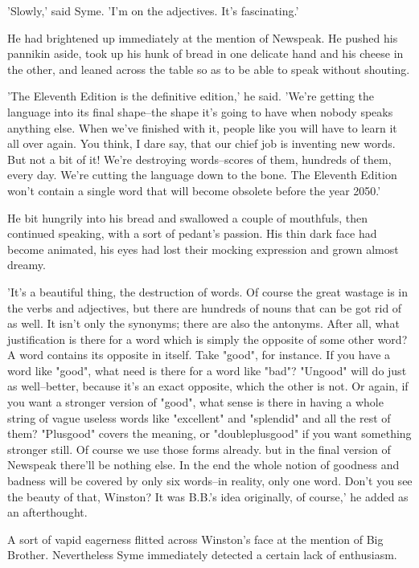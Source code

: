 \documentclass{article}
\begin{document}
'Slowly,' said Syme. 'I'm on the adjectives. It's fascinating.'

He had brightened up immediately at the mention of Newspeak. He pushed his
pannikin aside, took up his hunk of bread in one delicate hand and his
cheese in the other, and leaned across the table so as to be able to speak
without shouting.

'The Eleventh Edition is the definitive edition,' he said. 'We're getting
the language into its final shape--the shape it's going to have when nobody
speaks anything else. When we've finished with it, people like you will
have to learn it all over again. You think, I dare say, that our chief job
is inventing new words. But not a bit of it! We're destroying words--scores
of them, hundreds of them, every day. We're cutting the language down to
the bone. The Eleventh Edition won't contain a single word that will become
obsolete before the year 2050.'

He bit hungrily into his bread and swallowed a couple of mouthfuls, then
continued speaking, with a sort of pedant's passion. His thin dark face
had become animated, his eyes had lost their mocking expression and grown
almost dreamy.

'It's a beautiful thing, the destruction of words. Of course the great
wastage is in the verbs and adjectives, but there are hundreds of nouns
that can be got rid of as well. It isn't only the synonyms; there are also
the antonyms. After all, what justification is there for a word which is
simply the opposite of some other word? A word contains its opposite in
itself. Take "good", for instance. If you have a word like "good", what
need is there for a word like "bad"? "Ungood" will do just as well--better,
because it's an exact opposite, which the other is not. Or again, if you
want a stronger version of "good", what sense is there in having a whole
string of vague useless words like "excellent" and "splendid" and all the
rest of them? "Plusgood" covers the meaning, or "doubleplusgood" if you
want something stronger still. Of course we use those forms already. but
in the final version of Newspeak there'll be nothing else. In the end the
whole notion of goodness and badness will be covered by only six words--in
reality, only one word. Don't you see the beauty of that, Winston? It was
B.B.'s idea originally, of course,' he added as an afterthought.

A sort of vapid eagerness flitted across Winston's face at the mention of
Big Brother. Nevertheless Syme immediately detected a certain lack of
enthusiasm.
\end{document}
